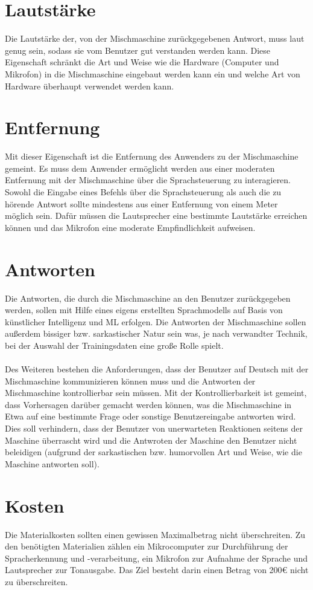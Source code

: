 \section{Lautstärke}
Die Lautstärke der, von der Mischmaschine zurückgegebenen Antwort, muss laut genug sein, sodass sie vom Benutzer gut verstanden werden kann. Diese Eigenschaft schränkt die Art und Weise wie die Hardware (Computer und Mikrofon) in die Mischmaschine eingebaut werden kann ein und welche Art von Hardware überhaupt verwendet werden kann.
\section{Entfernung}
Mit dieser Eigenschaft ist die Entfernung des Anwenders zu der Mischmaschine gemeint. Es muss dem Anwender ermöglicht werden aus einer moderaten Entfernung mit der Mischmaschine über die Sprachsteuerung zu interagieren. Sowohl die Eingabe eines Befehls über die Sprachsteuerung als auch die zu hörende Antwort sollte mindestens aus einer Entfernung von einem Meter möglich sein. Dafür müssen die Lautsprecher eine bestimmte Lautstärke erreichen können und das Mikrofon eine moderate Empfindlichkeit aufweisen.
\section{Antworten}
Die Antworten, die durch die Mischmaschine an den Benutzer zurückgegeben werden, sollen mit Hilfe eines eigens erstellten Sprachmodells auf Basis von künstlicher Intelligenz und \ac{ML} erfolgen. Die Antworten der Mischmaschine sollen außerdem bissiger bzw. sarkastischer Natur sein was, je nach verwandter Technik, bei der Auswahl der Trainingsdaten eine große Rolle spielt.\\\\
Des Weiteren bestehen die Anforderungen, dass der Benutzer auf Deutsch mit der Mischmaschine kommunizieren können muss und die Antworten der Mischmaschine kontrollierbar sein müssen. Mit der Kontrollierbarkeit ist gemeint, dass Vorhersagen darüber gemacht werden können, was die Mischmaschine in Etwa auf eine bestimmte Frage oder sonstige Benutzereingabe antworten wird. Dies soll verhindern, dass der Benutzer von unerwarteten Reaktionen seitens der Maschine überrascht wird und die Antwroten der Maschine den Benutzer nicht beleidigen (aufgrund der sarkastischen bzw. humorvollen Art und Weise, wie die Maschine antworten soll).     
\section{Kosten}
Die Materialkosten sollten einen gewissen Maximalbetrag nicht überschreiten. Zu den benötigten Materialien zählen ein Mikrocomputer zur Durchführung der Spracherkennung und -verarbeitung, ein Mikrofon zur Aufnahme der Sprache und Lautsprecher zur Tonausgabe. Das Ziel besteht darin einen Betrag von 200€ nicht zu überschreiten.
